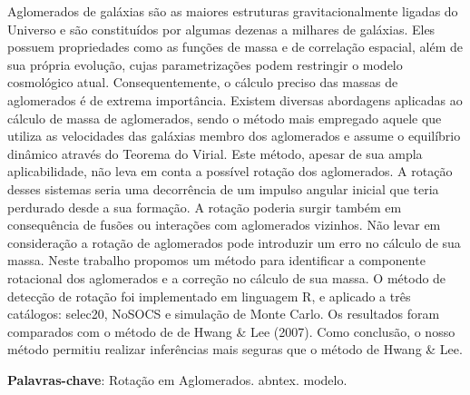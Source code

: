 %
%


\begin{center}
\imprimirtitulo
\end{center}

\begin{resumo}
Aglomerados de galáxias são as maiores estruturas gravitacionalmente ligadas do Universo e são constituídos por algumas dezenas a milhares de galáxias. Eles possuem propriedades como as funções de massa e de correlação espacial, além de sua própria evolução, cujas parametrizações podem restringir o modelo cosmológico atual.  Consequentemente, o cálculo preciso das massas de aglomerados é de extrema importância. Existem diversas abordagens aplicadas ao cálculo de massa de aglomerados, sendo o método mais empregado aquele que utiliza as velocidades das galáxias membro dos aglomerados e assume o equilíbrio dinâmico através do Teorema do Virial. 
Este método, apesar de sua ampla aplicabilidade, não leva em conta a possível rotação dos aglomerados. A rotação desses sistemas seria uma decorrência de um impulso angular inicial que teria perdurado desde a sua formação.  A rotação poderia surgir também  em consequência de fusões ou interações com aglomerados vizinhos. Não levar em consideração a rotação de aglomerados pode introduzir um erro no cálculo de sua massa. Neste trabalho propomos um método para identificar a componente rotacional dos aglomerados e a correção no cálculo de sua massa. O método de detecção de rotação foi implementado em linguagem R, e aplicado a três catálogos: selec20, NoSOCS e simulação de Monte Carlo. Os resultados foram comparados com o método de de Hwang \& Lee (2007). Como conclusão, o nosso método permitiu realizar inferências mais seguras que o método de Hwang \& Lee.  

\textbf{Palavras-chave}: Rotação em Aglomerados. abntex. modelo.

\end{resumo}
